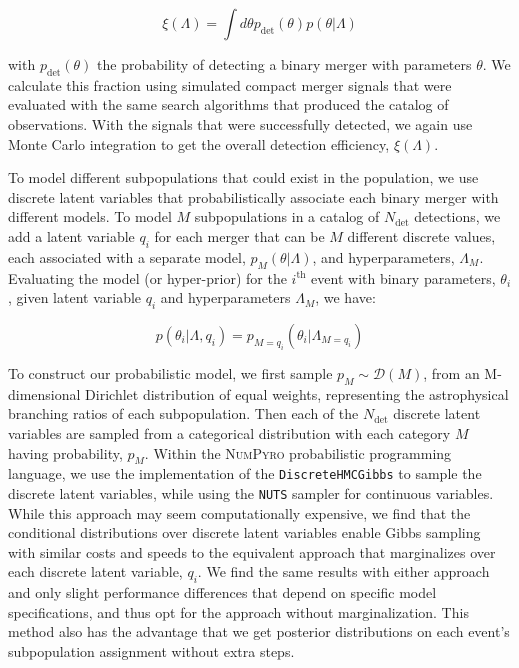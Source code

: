 \begin{equation} \label{eq:detfrac}
    \xi(\Lambda) = \int d\theta p_\mathrm{det}(\theta) p(\theta | \Lambda)
\end{equation}

\noindent with $p_\mathrm{det}(\theta)$ the probability of detecting a binary merger with parameters $\theta$. We calculate this fraction using simulated compact merger signals that were evaluated with the same search algorithms that produced the catalog of observations. With the signals that were successfully detected, we again use Monte Carlo integration to get the overall detection efficiency, $\xi(\Lambda)$.


To model different subpopulations that could exist in the population, we use discrete latent variables that probabilistically associate each binary merger with different models. To model $M$ subpopulations in a catalog of $N_\mathrm{det}$ detections, we add a latent variable $q_i$ for each merger that can be $M$ different discrete values, each associated with a separate model, $p_{M}(\theta | \Lambda)$, and hyperparameters, $\Lambda_M$. Evaluating the model (or hyper-prior) for the $i^\mathrm{th}$ event with binary parameters, $\theta_i$, given latent variable $q_i$ and hyperparameters $\Lambda_M$, we have:

\begin{equation} \label{eq:latent}
    p(\theta_i | \Lambda, q_i) = p_{M=q_i}(\theta_i | \Lambda_{M=q_i})
\end{equation}

\noindent To construct our probabilistic model, we first sample $p_M \sim \mathcal{D}(M)$, from an M-dimensional Dirichlet distribution of equal weights, representing the astrophysical branching ratios of each subpopulation. Then each of the $N_\mathrm{det}$ discrete latent variables are sampled from a categorical distribution with each category $M$ having probability, $p_M$. Within the \textsc{NumPyro} \citep{1810.09538,1912.11554} probabilistic programming language, we use the implementation of the \texttt{DiscreteHMCGibbs} \citep{Liu1996PeskunsTA} to sample the discrete latent variables, while using the \texttt{NUTS} \citep{1111.4246} sampler for continuous variables. While this approach may seem computationally expensive, we find that the conditional distributions over discrete latent variables enable Gibbs sampling with similar costs and speeds to the equivalent approach that marginalizes over each discrete latent variable, $q_i$. We find the same results with either approach and only slight performance differences that depend on specific model specifications, and thus opt for the approach without marginalization. This method also has the advantage that we get posterior distributions on each event's subpopulation assignment without extra steps.

